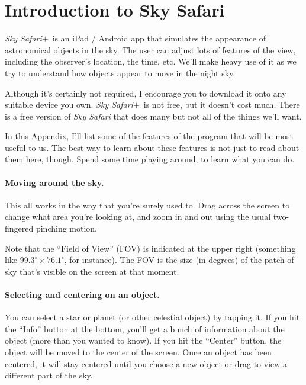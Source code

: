 \section{Introduction to Sky Safari}
\newcommand{\skysaf}{\textit{Sky Safari$+$}}

\bigskip\bigskip

\skysaf\ is an iPad / Android app that simulates the appearance
of astronomical objects in the sky. The user can adjust lots of
features of the view, including the observer's location,
the time, etc. We'll make heavy use of it as we try to understand
how objects appear to move in the night sky.

Although it's certainly not required, 
I encourage you to download it onto any suitable device
you own. \skysaf\ is not free, but it doesn't cost much.
There is a free version
of \textit{Sky Safari} that does many but not all of the things we'll want.

In this Appendix, I'll list some of the features of the program that will
be most useful to us. The best way to learn about these features is not
just to read about them here, though. Spend some time playing around, to learn
what you can do.


\paragraph{Moving around the sky.} 
This all works in the way that you're surely used to.
Drag across the screen to change what area you're looking at,
and zoom in and out using the usual two-fingered pinching motion.

Note that the ``Field of View'' (FOV) is indicated
at the upper right (something like $99.3^\circ\times 76.1^\circ$, for
instance). The FOV is the size (in degrees) of the
patch of sky that's visible on the screen at that moment.

\paragraph{Selecting and centering on an object.}
You can select a star or planet (or other celestial object)
by tapping it.
If you hit the ``Info'' button at the bottom,
you'll get a bunch of information about the object
(more than you wanted to know).
If you hit the
``Center'' button, the object will be moved
to the center of the screen. Once an object has been centered, it will
stay centered until you choose a new object or drag to view
a different part of the sky.

